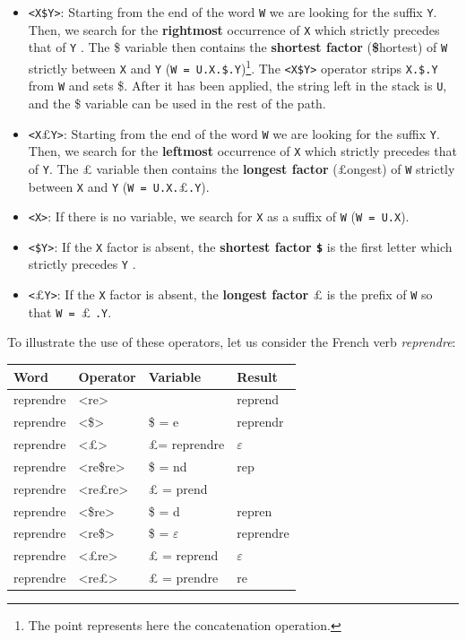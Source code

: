 \begin{itemize}
\item \verb+<X$Y>+: Starting from the end of the word \verb+W+  we are looking for the suffix \verb+Y+.
	Then, we search for the {\bf rightmost} occurrence of \verb+X+ which strictly precedes that 
	of  \verb+Y+ . The \$ variable then contains the {\bf shortest factor}
	({\bf\$}hortest) of \verb+W+ strictly between \verb+X+ and \verb+Y+ (\verb+W = U.X.$.Y+)\footnote{The point
	represents here the concatenation operation.}.
	The \verb+<X$Y>+ operator strips \verb+X.$.Y+ from \verb+W+ and sets \$. After it has been applied, the string
	left in the stack is \verb+U+, and the \$ variable can be used in the rest of the path.
\item \verb+<X+${\pounds}$\verb+Y>+:  Starting from the end of the word \verb+W+
	we are looking for the suffix \verb+Y+.
	Then, we search for the {\bf leftmost} occurrence of \verb+X+ which strictly precedes that of \verb+Y+.
	The {\pounds}  variable then contains the  {\bf longest factor}
	({\bf${\pounds}$}ongest) of \verb+W+ strictly between
	\verb+X+ and \verb+Y+ (\verb+W = U.X.+${\pounds}$\verb+.Y+).
\item \verb+<X>+: If there is no variable, we search for \verb+X+ as a suffix of \verb+W+
	(\verb+W = U.X+).
\item \verb+<$Y>+: If the \verb+X+ factor is absent,
	the {\bf shortest factor \verb+$+} is the first letter which strictly precedes \verb+Y+ .
\item \verb+<+${\pounds}$\verb+Y>+: If the \verb+X+ factor is absent,
	the {\bf longest factor ${\pounds}$} is the prefix of
	\verb+W+ so that  \verb+W = +${\pounds}$ \verb+.Y+.
\end{itemize}

\noindent
To illustrate the use of these operators, let us consider the French verb {\it reprendre}:

\bigskip
\begin{center}
\begin{tabular}{|l|l|l|l|}
\hline
Word     & Operator & Variable & Result\\
\hline
\hline
reprendre & <re> & & reprend\\
reprendre & <\$> & \$ = e & reprendr\\
reprendre & <{\pounds}> &{\pounds}= reprendre & $\varepsilon$ \\
reprendre & <re\$re> & \$ = nd & rep\\
reprendre & <re{\pounds}re> & {\pounds} = prend & \\
reprendre & <\$re> & \$ = d & repren\\
reprendre & <re\$> & \$ =  $\varepsilon$ & reprendre\\
reprendre & <{\pounds}re> & {\pounds} = reprend & $\varepsilon$\\
reprendre & <re{\pounds}> & {\pounds} = prendre & re\\
\hline
\end{tabular}
\end{center}

